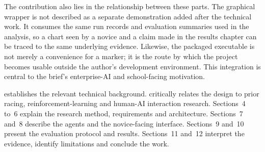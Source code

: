 The contribution also lies in the relationship between these parts. The graphical wrapper is not described as a separate demonstration added after the technical work. It consumes the same run records and evaluation summaries used in the analysis, so a chart seen by a novice and a claim made in the results chapter can be traced to the same underlying evidence. Likewise, the packaged executable is not merely a convenience for a marker; it is the route by which the project becomes usable outside the author's development environment. This integration is central to the brief's enterprise-AI and school-facing motivation.

 establishes the relevant technical background.  critically relates the design to prior racing, reinforcement-learning and human-AI interaction research. Sections~4 to~6 explain the research method, requirements and architecture. Sections~7 and~8 describe the agents and the novice-facing interface. Sections~9 and~10 present the evaluation protocol and results. Sections~11 and~12 interpret the evidence, identify limitations and conclude the work.

